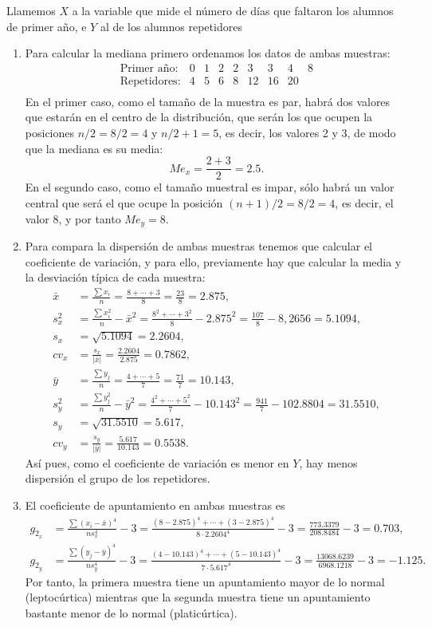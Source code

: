 {Llamemos $X$ a la variable que mide el número de días que faltaron los alumnos de primer año, e $Y$ al de los alumnos repetidores
\begin{enumerate}
\item Para calcular la mediana primero ordenamos los datos de ambas muestras:
\[
\begin{array}{lcccccccc}
\mbox{Primer año:}  & 0 & 1 & 2  & 2  & 3  & 3 & 4 & 8 \\
\mbox{Repetidores:} & 4 & 5 & 6 & 8 & 12 & 16 & 20 &   \\
\end{array}
\]
En el primer caso, como el tamaño de la muestra es par, habrá dos valores que estarán en el centro de la distribución, que serán los que ocupen la posiciones $n/2=8/2=4$ y $n/2+1=5$, es decir, los valores 2 y 3, de modo que la mediana es su media:
\[
Me_{x}=\frac{2+3}{2}=2.5.
\]
En el segundo caso, como el tamaño muestral es impar, sólo habrá un valor central que será el que ocupe la posición $(n+1)/2=8/2=4$, es decir, el valor 8, y por tanto $Me_{y}=8$.

\item Para compara la dispersión de ambas muestras tenemos que calcular el coeficiente de variación, y para ello, previamente hay que calcular la media y la desviación típica de cada muestra:
\begin{align*}
\bar{x} & = \frac{\sum x_{i}}{n}=\frac{8+\cdots+3}{8}=\frac{23}{8}=2.875,  \\
s_{x}^2 & = \frac{\sum x_{i}^2}{n}-\bar{x}^2 =
\frac{8^2+\cdots+3^2}{8}-2.875^2=\frac{107}{8}-8,2656=5.1094,  \\
s_{x} & = \sqrt{5.1094}=2.2604,  \\
cv_x &=\frac{s_x}{|\bar{x}|}=\frac{2.2604}{2.875}=0.7862,\\
\bar{y} & = \frac{\sum y_{j}}{n}=\frac{4+\cdots+5}{7}=
\frac{71}{7}=10.143,  \\
s_{y}^2 & = \frac{\sum y_{j}^2}{n}-\bar{y}^2 =
\frac{4^2+\cdots+5^2}{7}-10.143^2=\frac{941}{7}-102.8804=31.5510,  \\
s_{y} & = \sqrt{31.5510}=5.617,  \\
cv_y &=\frac{s_y}{|\bar{y}|}=\frac{5.617}{10.143}=0.5538.
\end{align*}
Así pues, como el coeficiente de variación es menor en $Y$, hay menos dispersión el grupo de los repetidores.

\item El coeficiente de apuntamiento en ambas muestras es
\begin{align*}
g_{2_x} &=\frac{\sum (x_i-\bar{x})^4}{ns_x^4}-3= \frac{(8-2.875)^4+\cdots + (3-2.875)^4}{8\cdot 2.2604^4}-3=\frac{773.3379}{208.8484}-3=0.703,\\
g_{2_y} &=\frac{\sum (y_j-\bar{y})^4}{ns_y^4}-3= \frac{(4-10.143)^4+\cdots + (5-10.143)^4}{7\cdot 5.617^4}-3=\frac{13068.6239}{6968.1218}-3=-1.125.
\end{align*}
Por tanto, la primera muestra tiene un apuntamiento mayor de lo normal (leptocúrtica) mientras que la segunda muestra tiene un apuntamiento bastante menor de lo normal (platicúrtica).
\end{enumerate}
}


